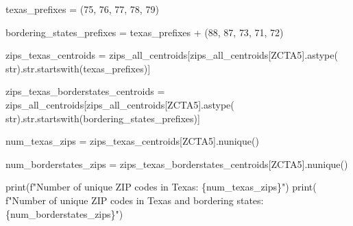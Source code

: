 \documentclass[
  letterpaper,
  DIV=11,
  numbers=noendperiod]{scrartcl}
\newenvironment{Shaded}{\begin{snugshade}}{\end{snugshade}}
\newcommand{\BuiltInTok}[1]{\textcolor[rgb]{0.00,0.23,0.31}{#1}}
\newcommand{\NormalTok}[1]{\textcolor[rgb]{0.00,0.23,0.31}{#1}}
\newcommand{\OperatorTok}[1]{\textcolor[rgb]{0.37,0.37,0.37}{#1}}
\newcommand{\SpecialCharTok}[1]{\textcolor[rgb]{0.37,0.37,0.37}{#1}}
\newcommand{\SpecialStringTok}[1]{\textcolor[rgb]{0.13,0.47,0.30}{#1}}
\newcommand{\StringTok}[1]{\textcolor[rgb]{0.13,0.47,0.30}{#1}}
\begin{document}
\begin{Shaded}
\begin{Highlighting}[]
\NormalTok{texas\_prefixes }\OperatorTok{=}\NormalTok{ (}\StringTok{\textquotesingle{}75\textquotesingle{}}\NormalTok{, }\StringTok{\textquotesingle{}76\textquotesingle{}}\NormalTok{, }\StringTok{\textquotesingle{}77\textquotesingle{}}\NormalTok{, }\StringTok{\textquotesingle{}78\textquotesingle{}}\NormalTok{, }\StringTok{\textquotesingle{}79\textquotesingle{}}\NormalTok{)}

\NormalTok{bordering\_states\_prefixes }\OperatorTok{=}\NormalTok{ texas\_prefixes }\OperatorTok{+}\NormalTok{ (}\StringTok{\textquotesingle{}88\textquotesingle{}}\NormalTok{, }\StringTok{\textquotesingle{}87\textquotesingle{}}\NormalTok{, }\StringTok{\textquotesingle{}73\textquotesingle{}}\NormalTok{, }\StringTok{\textquotesingle{}71\textquotesingle{}}\NormalTok{, }\StringTok{\textquotesingle{}72\textquotesingle{}}\NormalTok{)}

\NormalTok{zips\_texas\_centroids }\OperatorTok{=}\NormalTok{ zips\_all\_centroids[zips\_all\_centroids[}\StringTok{\textquotesingle{}ZCTA5\textquotesingle{}}\NormalTok{].astype(}
    \BuiltInTok{str}\NormalTok{).}\BuiltInTok{str}\NormalTok{.startswith(texas\_prefixes)]}

\NormalTok{zips\_texas\_borderstates\_centroids }\OperatorTok{=}\NormalTok{ zips\_all\_centroids[zips\_all\_centroids[}\StringTok{\textquotesingle{}ZCTA5\textquotesingle{}}\NormalTok{].astype(}
    \BuiltInTok{str}\NormalTok{).}\BuiltInTok{str}\NormalTok{.startswith(bordering\_states\_prefixes)]}

\NormalTok{num\_texas\_zips }\OperatorTok{=}\NormalTok{ zips\_texas\_centroids[}\StringTok{\textquotesingle{}ZCTA5\textquotesingle{}}\NormalTok{].nunique()}

\NormalTok{num\_borderstates\_zips }\OperatorTok{=}\NormalTok{ zips\_texas\_borderstates\_centroids[}\StringTok{\textquotesingle{}ZCTA5\textquotesingle{}}\NormalTok{].nunique()}

\BuiltInTok{print}\NormalTok{(}\SpecialStringTok{f"Number of unique ZIP codes in Texas: }\SpecialCharTok{\{}\NormalTok{num\_texas\_zips}\SpecialCharTok{\}}\SpecialStringTok{"}\NormalTok{)}
\BuiltInTok{print}\NormalTok{(}
    \SpecialStringTok{f"Number of unique ZIP codes in Texas and bordering states: }\SpecialCharTok{\{}\NormalTok{num\_borderstates\_zips}\SpecialCharTok{\}}\SpecialStringTok{"}\NormalTok{)}
\end{Highlighting}
\end{Shaded}
\end{document}
